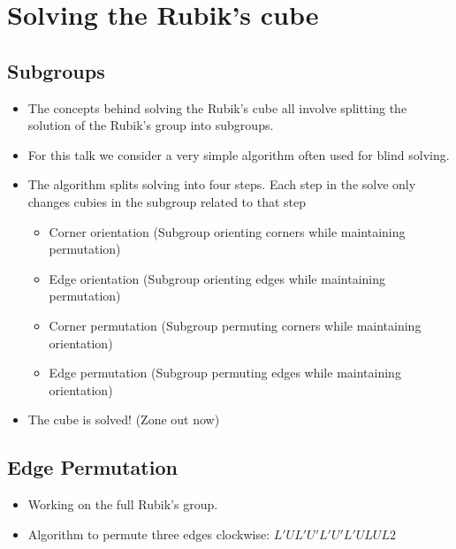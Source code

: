 \documentclass[xcolor=pdftex,dvipsnames,table]{beamer}
\begin{document}
\section{Solving the Rubik's cube}
\subsection{Subgroups}
\begin{frame}
  \begin{itemize}
    \item The concepts behind solving the Rubik's cube all involve splitting the solution of the Rubik's group into subgroups.
    \item For this talk we consider a very simple algorithm often used for blind solving.
    \item The algorithm splits solving into four steps. Each step in the solve only changes cubies in the subgroup related to that step
      \begin{itemize}
      \item Corner orientation (Subgroup orienting corners while maintaining permutation)
      \item Edge orientation (Subgroup orienting edges while maintaining permutation)
      \item Corner permutation (Subgroup permuting corners while maintaining orientation)
      \item Edge permutation (Subgroup permuting edges while maintaining orientation)
      \end{itemize}
    \item The cube is solved! (Zone out now)
  \end{itemize}
\end{frame}

\subsection{Edge Permutation}
\begin{frame}
  \begin{itemize}
  \item Working on the full Rubik's group.
  \item Algorithm to permute three edges clockwise: $L' U L' U' L' U' L' U L U L2$
  \end{itemize}
\end{frame}
\end{document}
